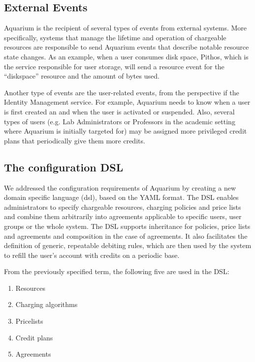 \documentclass[preprint,10pt]{sigplanconf}
\begin{document}
\subsection{External Events}
Aquarium is the recipient of several types of events from external systems. More specifically, systems that manage the lifetime and operation of chargeable resources are responsible to send Aquarium events that describe notable resource state changes. As an example, when a user consumes disk space, Pithos, which is the service responsible for user storage, will send a resource event for the ``diskspace'' resource and the amount of bytes used.

Another type of events are the user-related events, from the perspective if the Identity Management service. For example, Aquarium needs to know when a user is first created an and when the user is activated or suspended. Also, several types of users (e.g. Lab Administrators or Professors in the academic setting where Aquarium is initially targeted for) may be assigned more privileged credit plans that periodically give them more credits.


\subsection{The configuration DSL}
\label{sec:dsl}
We addressed the configuration requirements of Aquarium by creating a new
domain specific language ({\sc dsl}), based on the YAML format.  The DSL
enables administrators to specify chargeable resources, charging policies and
price lists and combine them arbitrarily into agreements applicable to specific
users, user groups or the whole system. 
The DSL supports inheritance for policies, price lists and agreements and composition in the case of agreements.
It also facilitates the
definition of generic, repeatable debiting rules, which are then used by the
system to refill the user's account with credits on a periodic base.

From the previously specified term, the following five are used in the DSL:

\begin{enumerate}
\item Resources
\item Charging algorithms
\item Pricelists
\item Credit plans
\item Agreements
\end{enumerate}
\end{document}
